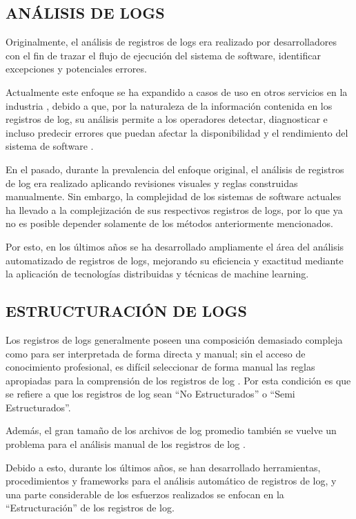 \subsection{ANÁLISIS DE LOGS}
Originalmente, el análisis de registros de logs era realizado por desarrolladores con el fin de trazar el flujo de ejecución del sistema de software, identificar excepciones y potenciales errores. \cite{jayathilake2011mind}

Actualmente este enfoque se ha expandido a casos de uso en otros servicios en la industria \cite{ma2023automatic}, debido a que, por la naturaleza de la información contenida en los registros de log, su análisis permite a los operadores detectar, diagnosticar e incluso predecir errores que puedan afectar la disponibilidad y el rendimiento del sistema de software \cite{jayathilake2011mind}.

En el pasado, durante la prevalencia del enfoque original, el análisis de registros de log era realizado aplicando revisiones visuales y reglas construidas manualmente. Sin embargo, la complejidad de los sistemas de software actuales ha llevado a la complejización de sus respectivos registros de logs, por lo que ya no es posible depender solamente de los métodos anteriormente mencionados. \cite{ma2023automatic}

Por esto, en los últimos años se ha desarrollado ampliamente el área del análisis automatizado de registros de logs, mejorando su eficiencia y exactitud mediante la aplicación de tecnologías distribuidas y técnicas de machine learning. \cite{ma2023automatic}

\subsection{ESTRUCTURACIÓN DE LOGS}
Los registros de logs generalmente poseen una composición demasiado compleja como para ser interpretada de forma directa y manual; sin el acceso de conocimiento profesional, es difícil seleccionar de forma manual las reglas apropiadas para la comprensión de los registros de log \cite{ma2023automatic}. Por esta condición es que se refiere a que los registros de log sean “No Estructurados” o “Semi Estructurados”. 

Además, el gran tamaño de los archivos de log promedio también se vuelve un problema para el análisis manual de los registros de log \cite{ma2023automatic}.

Debido a esto, durante los últimos años, se han desarrollado herramientas, procedimientos y frameworks para el análisis automático de registros de log, y una parte considerable de los esfuerzos realizados se enfocan en la “Estructuración” de los registros de log.

